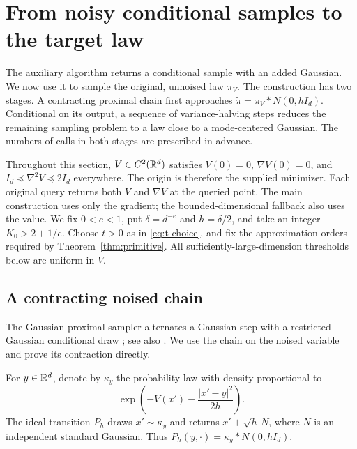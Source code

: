 \section{From noisy conditional samples to the target law}
\label{sec:sampling}

The auxiliary algorithm returns a conditional sample with an added
Gaussian. We now use it to sample the original, unnoised law
$\pi_V$. The construction has two stages. A contracting proximal chain
first approaches $\widetilde\pi=\pi_V*N(0,hI_d)$. Conditional on its
output, a sequence of variance-halving steps reduces the remaining
sampling problem to a law close to a mode-centered Gaussian. The
numbers of calls in both stages are prescribed in advance.

Throughout this section, $V\in C^2(\mathbb R^d)$ satisfies
$V(0)=0$, $\nabla V(0)=0$, and
$I_d\preceq\nabla^2V\preceq2I_d$ everywhere. The origin is therefore
the supplied minimizer. Each original query returns both $V$ and
$\nabla V$ at the queried point. The main construction uses only the
gradient; the bounded-dimensional fallback also uses the value.
We fix $0<e<1$, put $\delta=d^{-e}$ and $h=\delta/2$, and take an
integer $K_0>2+1/e$. Choose $t>0$ as in \eqref{eq:t-choice}, and
fix the approximation orders required by Theorem~\ref{thm:primitive}.
All sufficiently-large-dimension thresholds below are uniform in $V$.

\subsection{A contracting noised chain}

The Gaussian proximal sampler alternates a Gaussian step with a
restricted Gaussian conditional draw
\citep[Definition~1 and Lemmas~2 and~4]{lee2021proximal}; see also
\citet[Section~3 and Theorem~1]{chen2022proximal}. We use the chain
on the noised variable and prove its contraction directly.

For $y\in\mathbb R^d$, denote by $\kappa_y$ the probability law with density
proportional to
\begin{equation}\label{eq:proximal-conditional}
              \exp\!\left(-V(x')-\frac{|x'-y|^2}{2h}\right).
\end{equation}
The ideal transition $P_h$ draws $x'\sim\kappa_y$ and returns
$x'+\sqrt h\,N$, where $N$ is an independent standard Gaussian.
Thus $P_h(y,\cdot)=\kappa_y*N(0,hI_d)$.

